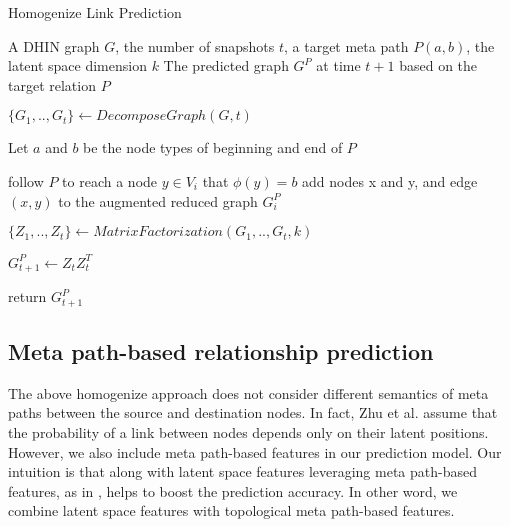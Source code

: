 \begin{algorithm}[t]
\caption{Homogenize Link Prediction}\label{alg1}
\begin{algorithmic}[1]\scriptsize
\REQUIRE A DHIN graph $G$, the number of snapshots $t$, a target meta path $P(a,b)$, the latent space dimension $k$
\ENSURE The predicted graph $G^P$ at time $t+1$ based on the target relation $P$

\STATE $\{G_1, .., G_t\} \leftarrow DecomposeGraph(G, t)$

    \STATE Let $a$ and $b$ be the node types of beginning and end of $P$
    
        \STATE follow $P$ to reach a node $y\in V_i$ that $\phi(y)=b$%
        \STATE add nodes x and y, and edge $(x,y)$ to the augmented reduced graph $G_i^P$ 
\ENDFOR

\ENDFOR
\STATE $\{Z_1, .., Z_t\} \leftarrow MatrixFactorization(G_1, .., G_t, k)$

\STATE $G^P_{t+1} \leftarrow Z_tZ^T_t$ 

\STATE return $G^P_{t+1}$
\end{algorithmic}
\end{algorithm}



\subsection{Meta path-based relationship prediction}

The above homogenize approach does not consider different semantics of meta paths between the source and destination nodes. In fact, Zhu et al. \cite{Zhu2016} assume that the probability of a link between nodes depends only on their latent positions. However, we also include meta path-based features in our prediction model. Our intuition is that along with latent space features leveraging meta path-based features, as in \cite{sun2011ASONAM}, helps to boost the prediction accuracy. In other word, we combine latent space features with topological meta path-based features.


\cite{sun2011ASONAM}

